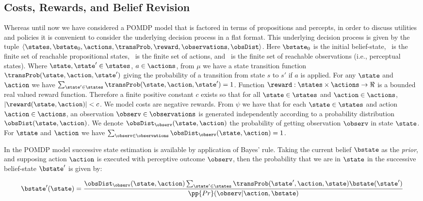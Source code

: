 \documentclass[letterpaper]{article}
\begin{document}
\subsection{Costs, Rewards, and Belief Revision}

Whereas until now we have considered a POMDP model that is factored in
terms of propositions and percepts, in order to discuss utilities and
policies it is convenient to consider the underlying decision process
in a flat format. This underlying decision process is given by the
tuple $\langle \states, \bstate_0, \actions, \transProb, \reward,
\observations, \obsDist \rangle$. Here $\bstate_0$ is the initial
belief-state, \states\ is the finite set of reachable propositional
states, \actions\ is the finite set of actions, and \observations\ is
the finite set of reachable observations (i.e., perceptual states).
Where $\state, \state' \in \states$, $a \in \actions$, from $\mu$ we
have a state transition function $\transProb(\state, \action,
\state')$ giving the probability of a transition from state $s$ to
$s'$ if $a$ is applied. For any $\state$ and $\action$ we have
$\sum_{\state' \in \states} \transProb(\state, \action, \state') = 1$.
Function $\reward:\states \times \actions \to \Re$ is a bounded real
valued reward function. Therefore a finite positive constant $c$
exists so that for all $\state \in \states$ and $\action \in
\actions$, $|\reward(\state, \action)| < c$. We model costs are
negative rewards.
From $\psi$ we have that for each $\state \in \states$ and action
$\action \in \actions$, an observation $\observ \in \observations$ is
generated independently according to a probability distribution
$\obsDist(\state, \action)$. We denote $\obsDist_\observ(\state,
\action)$ the probability of getting observation $\observ$ in state
$\state$. For $\state$ and $\action$ we have $\sum_{\observ \in
\observations} \obsDist_\observ(\state, \action) = 1$.

In the POMDP model successive state estimation is available by
application of Bayes' rule.  Taking the current belief $\bstate$ as
the {\em prior}, and supposing action $\action$ is executed with
perceptive outcome $\observ$, then the probability that we are in
$\state$ in the successive belief-state $\bstate'$ is given by:

\begin{equation}\label{eq:revision}
\bstate'(\state) = \frac{\obsDist_\observ(\state, \action)
  \sum_{\state'\in \states} \transProb(\state', \action, \state) \bstate(\state') }{\pp{Pr}(\observ | \action, \bstate)}
\end{equation}
\end{document}
